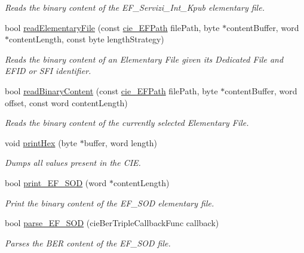 \begin{DoxyCompactItemize}
\begin{DoxyCompactList}\small\item\em Reads the binary content of the E\+F\+\_\+\+Servizi\+\_\+\+Int\+\_\+\+Kpub elementary file. \end{DoxyCompactList}\item 
bool \hyperlink{classcie__PN532_a72bb7d350ca91c2db370d6385a7258ff}{read\+Elementary\+File} (const \hyperlink{structcie__EFPath}{cie\+\_\+\+E\+F\+Path} file\+Path, byte $\ast$content\+Buffer, word $\ast$content\+Length, const byte length\+Strategy)
\begin{DoxyCompactList}\small\item\em Reads the binary content of an Elementary File given its Dedicated File and E\+F\+ID or S\+FI identifier. \end{DoxyCompactList}\item 
bool \hyperlink{classcie__PN532_ae5bf51526446549cbc4df8e64e9dbbe5}{read\+Binary\+Content} (const \hyperlink{structcie__EFPath}{cie\+\_\+\+E\+F\+Path} file\+Path, byte $\ast$content\+Buffer, word offset, const word content\+Length)
\begin{DoxyCompactList}\small\item\em Reads the binary content of the currently selected Elementary File. \end{DoxyCompactList}\item 
void \hyperlink{classcie__PN532_a991c44c5f24dc9bf9c9a195010418f0d}{print\+Hex} (byte $\ast$buffer, word length)\hypertarget{classcie__PN532_a991c44c5f24dc9bf9c9a195010418f0d}{}\label{classcie__PN532_a991c44c5f24dc9bf9c9a195010418f0d}

\begin{DoxyCompactList}\small\item\em Dumps all values present in the C\+IE. \end{DoxyCompactList}\item 
bool \hyperlink{classcie__PN532_aebce9ebab902380347663ad720e6be9e}{print\+\_\+\+E\+F\+\_\+\+S\+OD} (word $\ast$content\+Length)
\begin{DoxyCompactList}\small\item\em Print the binary content of the E\+F\+\_\+\+S\+OD elementary file. \end{DoxyCompactList}\item 
bool \hyperlink{classcie__PN532_a7b3645222645c67b2af061e0a5e9b13a}{parse\+\_\+\+E\+F\+\_\+\+S\+OD} (cie\+Ber\+Triple\+Callback\+Func callback)
\begin{DoxyCompactList}\small\item\em Parses the B\+ER content of the E\+F\+\_\+\+S\+OD file. \end{DoxyCompactList}\end{DoxyCompactItemize}



